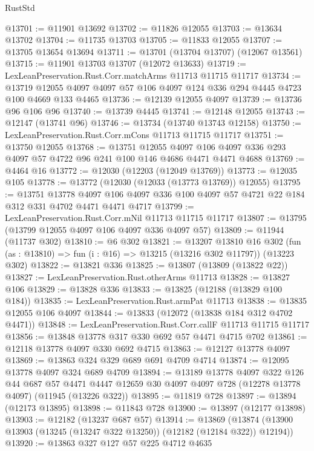 \begin{lexlean}{RustStd}
\begin{coremodule}
@13701 := @11901 @13692
@13702 := @11826 @12055
@13703 := @13634 @13702
@13704 := @11735 @13703
@13705 := @11833 @12055
@13707 := @13705 @13654 @13694
@13711 := @13701 (@13704 @13707) (@12067 @13561)
@13715 := @11901 @13703 @13707 (@12072 @13633)
@13719 := LexLeanPreservation.Rust.Corr.matchArms @11713 @11715 @11717
@13734 := @13719 @12055 @4097 @4097 @57 @106 @4097 @124 @336 @294 @4445 @4723 @100 @4669 @133 @4465
@13736 := @12139 @12055 @4097
@13739 := @13736 @96 @106 @96
@13740 := @13739 @4445
@13741 := @12148 @12055
@13743 := @12147 (@13741 @96)
@13746 := @13734 (@13740 @13743 @12158)
@13750 := LexLeanPreservation.Rust.Corr.mCons @11713 @11715 @11717
@13751 := @13750 @12055
@13768 := @13751
    @12055
    @4097
    @106
    @4097
    @336
    @293
    @4097
    @57
    @4722
    @96
    @241
    @100
    @146
    @4686
    @4471
    @4471
    @4688
@13769 := @4464 @16
@13772 := @12030 (@12203 (@12049 @13769))
@13773 := @12035 @105
@13778 := @13772 (@12030 (@12033 (@13773 @13769)) @12055)
@13795 := @13751
    @13778
    @4097
    @106
    @4097
    @336
    @100
    @4097
    @57
    @4721
    @22
    @184
    @312
    @331
    @4702
    @4471
    @4471
    @4717
@13799 := LexLeanPreservation.Rust.Corr.mNil @11713 @11715 @11717
@13807 := @13795 (@13799 @12055 @4097 @106 @4097 @336 @4097 @57)
@13809 := @11944 (@11737 @302)
@13810 := @6 @302
@13821 := @13207
    @13810
    @16
    @302
    (fun (as : @13810) => fun (i : @16) => @13215 (@13216 @302 @11797))
    (@13223 @302)
@13822 := @13821 @336
@13825 := @13807 (@13809 (@13822 @22))
@13827 := LexLeanPreservation.Rust.otherArms @11713
@13828 := @13827 @106
@13829 := @13828 @336
@13833 := @13825 (@12188 (@13829 @100 @184))
@13835 := LexLeanPreservation.Rust.armPat @11713
@13838 := @13835 @12055 @106 @4097
@13844 := @13833 (@12072 (@13838 @184 @312 @4702 @4471))
@13848 := LexLeanPreservation.Rust.Corr.callF @11713 @11715 @11717
@13856 := @13848 @13778 @317 @330 @692 @57 @4471 @4715 @702
@13861 := @12118 @13778 @4097 @330 @692 @4715
@13863 := @12127 @13778 @4097
@13869 := @13863 @324 @329 @689 @691 @4709 @4714
@13874 := @12095 @13778 @4097 @324 @689 @4709
@13894 := @13189
    @13778
    @4097
    @322
    @126
    @44
    @687
    @57
    @4471
    @4447
    @12659
    @30
    @4097
    @4097
    @728
    (@12278 @13778 @4097)
    (@11945 (@13226 @322))
@13895 := @11819 @728
@13897 := @13894 (@12173 @13895)
@13898 := @11843 @728
@13900 := @13897 (@12177 @13898)
@13903 := @12182 (@13237 @687 @57)
@13914 := @13869
    (@13874 (@13900 @13903 (@13245 (@13247 @322 @13250)) (@12182 (@12184 @322)) @12194))
@13920 := @13863 @327 @127 @57 @225 @4712 @4635

\end{coremodule}
\end{lexlean}
